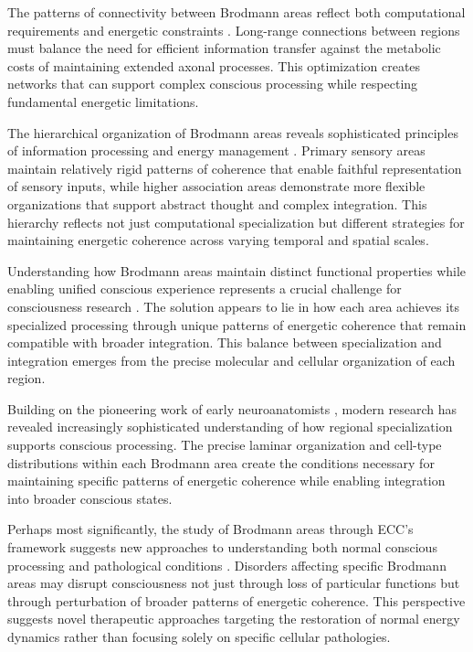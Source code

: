 The patterns of connectivity between Brodmann areas reflect both computational requirements and energetic constraints \cite{VanEssen2012}. Long-range connections between regions must balance the need for efficient information transfer against the metabolic costs of maintaining extended axonal processes. This optimization creates networks that can support complex conscious processing while respecting fundamental energetic limitations.

The hierarchical organization of Brodmann areas reveals sophisticated principles of information processing and energy management \cite{Amunts2015}. Primary sensory areas maintain relatively rigid patterns of coherence that enable faithful representation of sensory inputs, while higher association areas demonstrate more flexible organizations that support abstract thought and complex integration. This hierarchy reflects not just computational specialization but different strategies for maintaining energetic coherence across varying temporal and spatial scales.

Understanding how Brodmann areas maintain distinct functional properties while enabling unified conscious experience represents a crucial challenge for consciousness research \cite{Scholtens2014}. The solution appears to lie in how each area achieves its specialized processing through unique patterns of energetic coherence that remain compatible with broader integration. This balance between specialization and integration emerges from the precise molecular and cellular organization of each region.

Building on the pioneering work of early neuroanatomists \cite{Vogt1919}, modern research has revealed increasingly sophisticated understanding of how regional specialization supports conscious processing. The precise laminar organization and cell-type distributions within each Brodmann area create the conditions necessary for maintaining specific patterns of energetic coherence while enabling integration into broader conscious states.

Perhaps most significantly, the study of Brodmann areas through ECC's framework suggests new approaches to understanding both normal conscious processing and pathological conditions \cite{Amunts2015}. Disorders affecting specific Brodmann areas may disrupt consciousness not just through loss of particular functions but through perturbation of broader patterns of energetic coherence. This perspective suggests novel therapeutic approaches targeting the restoration of normal energy dynamics rather than focusing solely on specific cellular pathologies.


